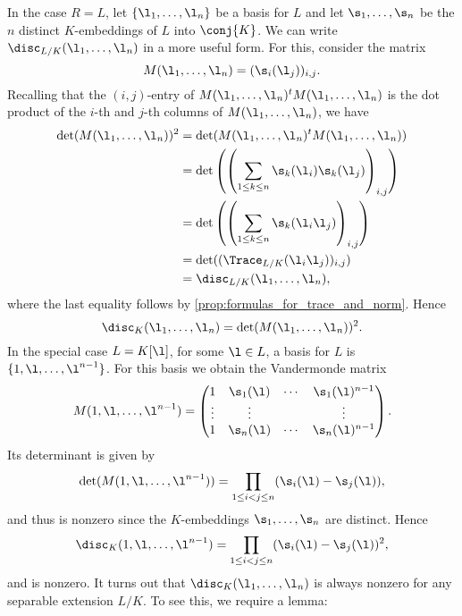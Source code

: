     In the case $R = L$, let $\{\l_{1},\ldots,\l_{n}\}$ be a basis for $L$ and let $\s_{1},\ldots,\s_{n}$ be the $n$ distinct $K$-embeddings of $L$ into $\conj{K}$. We can write $\disc_{L/K}(\l_{1},\ldots,\l_{n})$ in a more useful form. For this, consider the matrix 
    \[
      M(\l_{1},\ldots,\l_{n}) = (\s_{i}(\l_{j}))_{i,j}. 
    \]
    Recalling that the $(i,j)$-entry of $M(\l_{1},\ldots,\l_{n})^{t}M(\l_{1},\ldots,\l_{n})$ is the dot product of the $i$-th and $j$-th columns of $M(\l_{1},\ldots,\l_{n})$, we have
    \begin{align*}
      \det(M(\l_{1},\ldots,\l_{n}))^{2} &= \det(M(\l_{1},\ldots,\l_{n})^{t}M(\l_{1},\ldots,\l_{n})) \\
      &= \det\left(\left(\sum_{1 \le k \le n}\s_{k}(\l_{i})\s_{k}(\l_{j})\right)_{i,j}\right) \\
      &= \det\left(\left(\sum_{1 \le k \le n}\s_{k}(\l_{i}\l_{j})\right)_{i,j}\right) \\
      &= \det((\Trace_{L/K}(\l_{i}\l_{j}))_{i,j}) \\
      &= \disc_{L/K}(\l_{1},\ldots,\l_{n}),
    \end{align*}
    where the last equality follows by \cref{prop:formulas_for_trace_and_norm}. Hence
    \begin{equation}\label{equ:discriminant_square_when_seperable}
      \disc_{K}(\l_{1},\ldots,\l_{n}) =  \det(M(\l_{1},\ldots,\l_{n}))^{2}.
    \end{equation}
    In the special case $L = K[\l]$, for some $\l \in L$, a basis for $L$ is $\{1,\l,\ldots,\l^{n-1}\}$. For this basis we obtain the Vandermonde matrix
    \[
      M(1,\l,\ldots,\l^{n-1}) = \begin{pmatrix} 1 & \s_{1}(\l) & \cdots & \s_{1}(\l)^{n-1} \\ \vdots & \vdots & & \vdots \\  1 & \s_{n}(\l) & \cdots & \s_{n}(\l)^{n-1} \end{pmatrix}.
    \]
    Its determinant is given by
    \[
      \det(M(1,\l,\ldots,\l^{n-1})) = \prod_{1 \le i < j \le n}(\s_{i}(\l)-\s_{j}(\l)),
    \]
    and thus is nonzero since the $K$-embeddings $\s_{1},\ldots,\s_{n}$ are distinct. Hence
    \begin{equation}\label{equ:simple_discriminant}
      \disc_{K}(1,\l,\ldots,\l^{n-1}) = \prod_{1 \le i < j \le n}(\s_{i}(\l)-\s_{j}(\l))^{2},
    \end{equation}
    and is nonzero. It turns out that $\disc_{K}(\l_{1},\ldots,\l_{n})$ is always nonzero for any separable extension $L/K$. To see this, we require a lemma:

